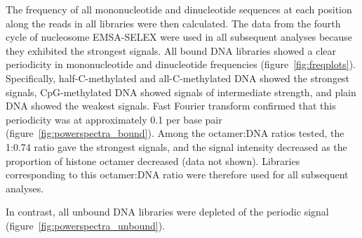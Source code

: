 \documentclass[parskip=full, numbers=noenddot]{scrreprt}
\begin{document}
The frequency of all mononucleotide and dinucleotide sequences at each position along the reads in all libraries were then calculated.  The data from the fourth cycle of nucleosome EMSA-SELEX were used in all subsequent analyses because they exhibited the strongest signals.  All bound DNA libraries showed a clear periodicity in mononucleotide and dinucleotide frequencies (figure~\ref{fig:freqplots}).  Specifically, half-C-methylated and all-C-methylated DNA showed the strongest signals, CpG-methylated DNA showed signals of intermediate strength, and plain DNA showed the weakest signals.  Fast Fourier transform confirmed that this periodicity was at approximately 0.1 per base pair (figure~\ref{fig:powerspectra_bound}).  Among the octamer:DNA ratios tested, the 1:0.74 ratio gave the strongest signals, and the signal intensity decreased as the proportion of histone octamer decreased (data not shown).  Libraries corresponding to this octamer:DNA ratio were therefore used for all subsequent analyses.

In contrast, all unbound DNA libraries were depleted of the periodic signal (figure~\ref{fig:powerspectra_unbound}).
\end{document}
